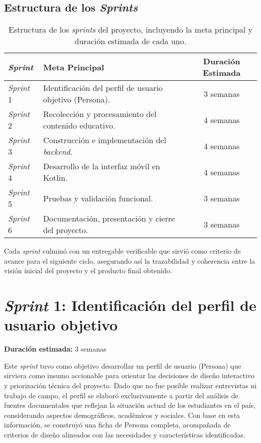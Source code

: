 \subsection{Estructura de los \textit{Sprints}}
\begin{table}[H]
      \centering
      \renewcommand{\arraystretch}{1.2}
      \begin{tabular}{|l|p{8cm}|c|}
            \hline
            \textbf{\textit{Sprint}} & \textbf{Meta Principal}                                  & \textbf{Duración Estimada} \\ \hline
            \textit{Sprint} 1        & Identificación del perfil de usuario objetivo (Persona). & 3 semanas                  \\ \hline
            \textit{Sprint} 2        & Recolección y procesamiento del contenido educativo.     & 4 semanas                  \\ \hline
            \textit{Sprint} 3        & Construcción e implementación del \textit{backend}.      & 4 semanas                  \\ \hline
            \textit{Sprint} 4        & Desarrollo de la interfaz móvil en Kotlin.               & 4 semanas                  \\ \hline
            \textit{Sprint} 5        & Pruebas y validación funcional.                          & 3 semanas                  \\ \hline
            \textit{Sprint} 6        & Documentación, presentación y cierre del proyecto.       & 3 semanas                  \\ \hline
      \end{tabular}
      \caption[Estructura de los \textit{Sprints}]{Estructura de los \textit{sprints} del proyecto, incluyendo la meta principal y duración estimada de cada uno.}
      \label{tab:estructura-sprints}
\end{table}

Cada \textit{sprint} culminó con un entregable verificable que sirvió como
criterio de avance para el siguiente ciclo, asegurando así la trazabilidad y
coherencia entre la visión inicial del proyecto y el producto final obtenido.

\section{\textit{Sprint} 1: Identificación del perfil de usuario objetivo}
\textbf{Duración estimada:} 3 semanas

Este \textit{sprint} tuvo como objetivo desarrollar un perfil de usuario
(Persona) que sirviera como insumo accionable para orientar las decisiones de
diseño interactivo y priorización técnica del proyecto. Dado que no fue posible
realizar entrevistas ni trabajo de campo, el perfil se elaboró exclusivamente a
partir del análisis de fuentes documentales que reflejan la situación actual de
los estudiantes en el país, considerando aspectos demográficos, académicos y
sociales. Con base en esta información, se construyó una ficha de Persona
completa, acompañada de criterios de diseño alineados con las necesidades y
características identificadas.

